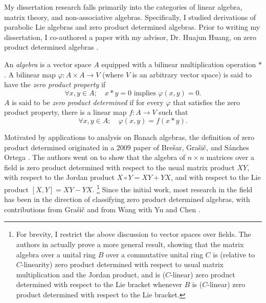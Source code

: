 \documentclass[11pt]{article}
\begin{document}

\makeletterhead

\maketitle

\vfill

My dissertation research falls primarily into the categories of linear
algebra, matrix theory, and non-associative algebras. Specifically,
I studied derivations of parabolic Lie algebras and zero product
determined algebras. Prior to writing my dissertation, I co-authored a
paper with my advisor, Dr. Huajun Huang, on zero product determined
algebras \cite{brice2015zero}.



An \emph{algebra} is a vector space $A$ equipped with a bilinear
multiplication operation $\ast$. A bilinear map
$\varphi : A \times A \to V$ (where $V$ is an arbitrary vector space)
is said to have the \emph{zero product property} if
\[
  \forall x, y \in A;\quad
  x \ast y = 0 \text{ implies } \varphi(x,y) = 0
  \text{.}
\]
$A$ is said to be \emph{zero product determined} if for every $\varphi$
that satisfies the zero product property, there is a linear map
$f : A \to V$ such that
\[
  \forall x, y \in A;\quad
  \varphi(x,y) = f(x \ast y)
  \text{.}
\]

Motivated by applications to analysis on Banach algebras, the definition
of zero product determined originated in a 2009 paper of Bre\v{s}ar,
Gra\v{s}i\v{c}, and S\'{a}nches Ortega \cite{brevsar2009zero}.
The authors went on to show that the algebra of $n \times n$ matrices
over a field is zero product determined with respect to the usual matrix
product $XY$, with respect to the Jordan product $X \circ Y = XY + YX$,
and with respect to the Lie product $[X,Y] = XY - YX$.
\footnote{For brevity, I restrict the above discussion to vector spaces
over fields. The authors in \cite{brevsar2009zero} actually prove a more
general result, showing that the matrix algebra over a unital ring $B$
over a commutative unital ring $C$ is (relative to $C$-linearity) zero
product determined with respect to usual matrix multiplication and the
Jordan product, and is ($C$-linear) zero product determined with respect
to the Lie bracket whenever $B$ is ($C$-linear) zero product determined
with respect to the Lie bracket.}
Since the initial work, most research in the field has been in the
direction of classifying zero product determined algebras,
with contributions from Gra\v{s}i\v{c} \cite{gravsivc2010zero}
and from Wang with Yu and Chen \cite{wang2011class}.
\end{document}
